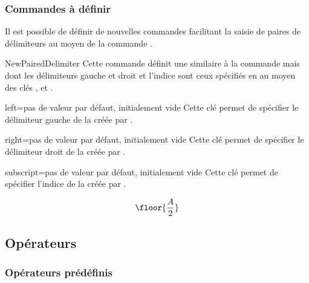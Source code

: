 \documentclass[french,nolocaltoc]{nwejmart}
\newtheorem[title=Fait,style=definition]{fact}
\begin{document}
\subsubsection{Commandes à définir}

Il est possible de définir de nouvelles commandes facilitant la saisie de paires
de délimiteurs au moyen de la commande .
%
\begin{docCommand}{NewPairedDelimiter}{}
  Cette commande définit une  similaire à la commande
   mais dont les délimiteurs gauche et droit et l'indice
  sont ceux spécifiés en  au moyen des clés ,
   et .
  \begin{docKey}{left}{=}{pas de valeur par défaut,
      initialement vide}
    Cette clé permet de spécifier le délimiteur gauche de la 
    créée par .
  \end{docKey}
  \begin{docKey}{right}{=}{pas de valeur par défaut,
      initialement vide}
    Cette clé permet de spécifier le délimiteur droit de la 
    créée par .
  \end{docKey}
  \begin{docKey}{subscript}{=}{pas de valeur par défaut,
      initialement vide}
    Cette clé permet de spécifier l'indice de la  créée par
    .
  \end{docKey}
\end{docCommand}

\begin{preamblecode}
\end{preamblecode}
\begin{bodycode}
\begin{equation}
\floor{\frac{A}{2}}
\end{equation}
\end{bodycode}

\subsection{Opérateurs}

\subsubsection{Opérateurs prédéfinis}
\end{document}
